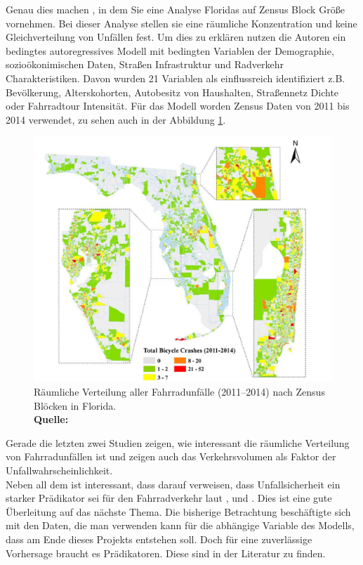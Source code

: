 \documentclass[a4paper,12pt]{thesis}
\newcommand*{\captionsource}[2]{%
	\caption[{#1}]{%
		#1%
		\\\hspace{\linewidth}%
		\textbf{Quelle:} #2%
	}%
}
\begin{document}
Genau dies machen \cite{Saha2018}, in dem Sie eine Analyse Floridas auf Zensus Block Größe vornehmen. Bei dieser Analyse stellen sie eine räumliche Konzentration und keine Gleichverteilung von Unfällen fest. Um dies zu erklären nutzen die Autoren ein bedingtes autoregressives Modell mit bedingten Variablen der Demographie, sozioökonimischen Daten, Straßen Infrastruktur und Radverkehr Charakteristiken. Davon wurden 21 Variablen als einflussreich identifiziert z.B. Bevölkerung, Alterskohorten, Autobesitz von Haushalten, Straßennetz Dichte oder Fahrradtour Intensität. Für das Modell worden Zensus Daten von 2011 bis 2014 verwendet, zu sehen auch in der Abbildung \ref{SAHA}.  
\begin{figure}[!ht]
	\centering
	\includegraphics[width=\textwidth]{Plots/saha.png}
	\captionsource{Räumliche Verteilung aller Fahrradunfälle (2011–2014) nach Zensus Blöcken in Florida.}{
		\cite{Saha2018}
	}
	\label{SAHA}
\end{figure}
Gerade die letzten zwei Studien zeigen, wie interessant die räumliche Verteilung von Fahrradunfällen ist und \cite{Kondo2018} zeigen auch das Verkehrsvolumen als Faktor der Unfallwahrscheinlichkeit.\\
Neben all dem ist interessant, dass \cite{Kondo2018} darauf verweisen, dass Unfallsicherheit ein starker Prädikator sei für den Fahrradverkehr laut \cite{Pucher2010}, \cite{Thomas2013} und \cite{Winters2010}. Dies ist eine gute Überleitung auf das nächste Thema. Die bisherige Betrachtung beschäftigte sich mit den Daten, die man verwenden kann für die abhängige Variable des Modells, dass am Ende dieses Projekts entstehen soll. Doch für eine zuverlässige Vorhersage braucht es Prädikatoren. Diese sind in der Literatur zu finden.
\end{document}
